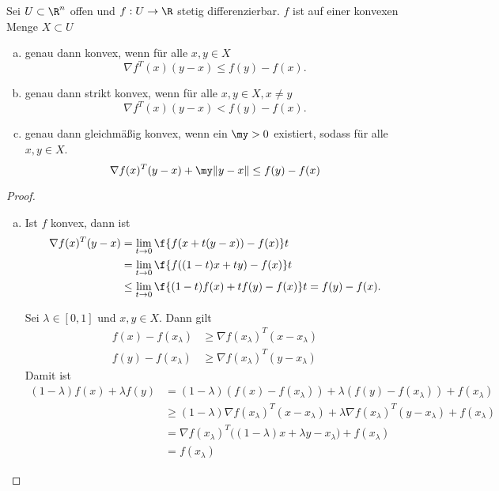 \begin{st} \label{2.16}
	Sei $U \subset \R^n$ offen und $f: U \to \R$ stetig differenzierbar.
	$f$ ist auf einer konvexen Menge $X \subset U$
	\begin{enumerate}[(a)]
		\item
			genau dann konvex, wenn für alle $x,y \in X$
			\[
				\nabla f^T(x) (y-x)
				\le f(y) - f(x).
			\]
		\item
			genau dann strikt konvex, wenn für alle $x,y \in X, x \neq y$
			\[
				\nabla f^T(x) (y-x)
				< f(y) - f(x).
			\]
		\item
			genau dann gleichmäßig konvex, wenn ein $\my > 0$ existiert, sodass für alle $x,y \in X$.
			\[
				\nabla f(x)^T (y-x) + \my \|y-x\|
				\le f(y) - f(x)
			\]
	\end{enumerate}
	\begin{proof}
		\begin{enumerate}[(a)]
			\item
				\begin{seg}[„$\implies$“]
					Ist $f$ konvex, dann ist
					\begin{align*}
						\nabla f(x)^T (y-x)
						&= \lim_{t \to 0} \f {f(x+t(y-x)) - f(x)}t \\
						&= \lim_{t \to 0} \f {f((1-t)x + ty) - f(x)}t \\
						&\le \lim_{t \to 0} \f{(1-t)f(x) + tf(y) - f(x)}t
						= f(y) - f(x).
					\end{align*}
				\end{seg}
				\begin{seg}[„$\impliedby$“]
					Sei $\lambda \in [0,1]$ und $x,y \in X$.
					Dann gilt
					\begin{align*}
						f(x) - f(x_\lambda)
						&\ge \nabla f(x_\lambda)^T(x-x_\lambda) \\
						f(y) - f(x_\lambda)
						&\ge \nabla f(x_\lambda)^T(y-x_\lambda)
					\end{align*}
					Damit ist
					\begin{align*}
						(1-\lambda) f(x) + \lambda f(y)
						&= (1-\lambda)(f(x) - f(x_\lambda)) + \lambda (f(y) - f(x_\lambda)) + f(x_\lambda) \\
						&\ge (1-\lambda) \nabla f(x_\lambda)^T (x-x_\lambda) + \lambda \nabla f(x_\lambda)^T (y-x_\lambda) + f(x_\lambda) \\
						&= \nabla f(x_\lambda)^T \big( (1-\lambda) x + \lambda y - x_\lambda \big) + f(x_\lambda) \\
						&= f(x_\lambda)
					\end{align*}

\end{seg}
\end{enumerate}
\end{proof}
\end{st}
